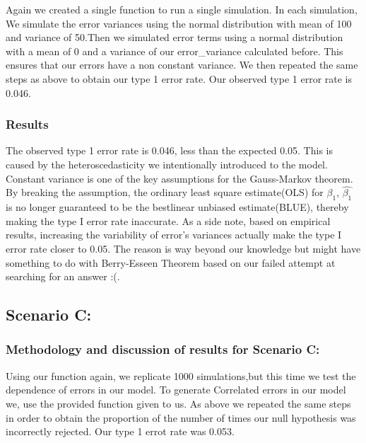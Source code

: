 \documentclass[
]{article}
\begin{document}
Again we created a single function to run a single simulation. In each
simulation, We simulate the error variances using the normal
distribution with mean of 100 and variance of 50.Then we simulated error
terms using a normal distribution with a mean of 0 and a variance of our
error\_variance calculated before. This ensures that our errors have a
non constant variance. We then repeated the same steps as above to
obtain our type 1 error rate. Our observed type 1 error rate is 0.046.

\hypertarget{results-1}{%
\subsubsection{Results}\label{results-1}}

The observed type 1 error rate is 0.046, less than the expected 0.05.
This is caused by the heteroscedasticity we intentionally introduced to
the model. Constant variance is one of the key assumptions for the
Gauss-Markov theorem. By breaking the assumption, the ordinary least
square estimate(OLS) for \(\beta_1\), \(\hat{\beta_1}\) is no longer
guaranteed to be the bestlinear unbiased estimate(BLUE), thereby making
the type I error rate inaccurate. As a side note, based on empirical
results, increasing the variability of error's variances actually make
the type I error rate closer to 0.05. The reason is way beyond our
knowledge but might have something to do with Berry-Esseen Theorem based
on our failed attempt at searching for an answer :(.

\hypertarget{scenario-c}{%
\subsection{Scenario C:}\label{scenario-c}}

\hypertarget{methodology-and-discussion-of-results-for-scenario-c}{%
\subsubsection{Methodology and discussion of results for Scenario
C:}\label{methodology-and-discussion-of-results-for-scenario-c}}

Using our function again, we replicate 1000 simulations,but this time we
test the dependence of errors in our model. To generate Correlated
errors in our model we, use the provided function given to us. As above
we repeated the same steps in order to obtain the proportion of the
number of times our null hypothesis was incorrectly rejected. Our type 1
errot rate was 0.053.
\end{document}
